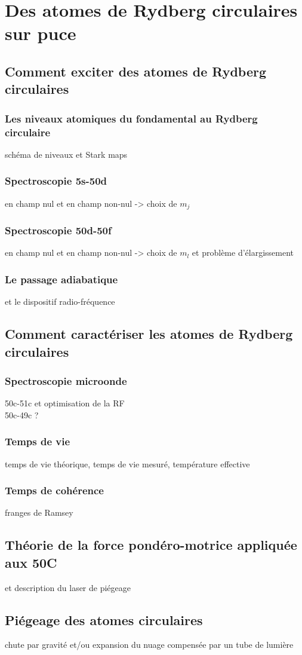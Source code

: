 \chapter{Des atomes de Rydberg circulaires sur puce}
\label{chapter:50c}

\section{Comment exciter des atomes de Rydberg circulaires}
	\subsection*{Les niveaux atomiques du fondamental au Rydberg circulaire}
		\noindent schéma de niveaux et Stark maps
	\subsection*{Spectroscopie 5s-50d}
		\noindent en champ nul et en champ non-nul -> choix de $m_j$
	\subsection*{Spectroscopie 50d-50f}
		\noindent en champ nul et en champ non-nul -> choix de $m_l$ et problème d'élargissement
	\subsection*{Le passage adiabatique}
		\noindent et le dispositif radio-fréquence

\section{Comment caractériser les atomes de Rydberg circulaires}
	\subsection*{Spectroscopie microonde}
		\noindent 50c-51c et optimisation de la RF\\
		\noindent 50c-49c ?
	\subsection*{Temps de vie}
		\noindent temps de vie théorique, temps de vie mesuré, température effective
	\subsection*{Temps de cohérence}
		\noindent franges de Ramsey
	

\section{Théorie de la force pondéro-motrice appliquée aux 50C}
	\noindent et description du laser de piégeage

\section{Piégeage des atomes circulaires}
	\noindent chute par gravité et/ou expansion du nuage compensée par un tube de lumière
